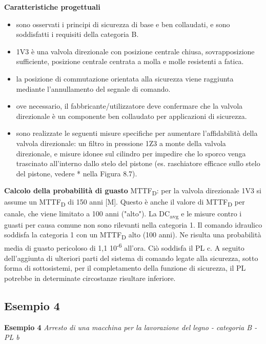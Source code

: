 \textbf{Caratteristiche progettuali}
\begin{itemize}
    \item sono osservati i principi di sicurezza di base e ben collaudati, e sono soddisfatti i requisiti della categoria B.
    \item 1V3 è una valvola direzionale con posizione centrale chiusa, sovrapposizione sufficiente, posizione centrale centrata a molla e molle resistenti a fatica.
    \item la posizione di commutazione orientata alla sicurezza viene raggiunta mediante l'annullamento del segnale di comando.
    \item ove necessario, il fabbricante/utilizzatore deve confermare che la valvola direzionale è un componente ben collaudato per applicazioni di sicurezza.
    \item sono realizzate le seguenti misure specifiche per aumentare l'affidabilità della valvola direzionale: un filtro in pressione 1Z3 a monte della valvola direzionale, e misure idonee sul cilindro per impedire che lo sporco venga trascinato all'interno dallo stelo del pistone (es. raschiatore efficace sullo stelo del pistone, vedere * nella Figura 8.7).
\end{itemize}

\textbf{Calcolo della probabilità di guasto}
MTTF\textsubscript{D}: per la valvola direzionale 1V3 si assume un MTTF\textsubscript{D} di 150 anni [M]. Questo è anche il valore di MTTF\textsubscript{D} per canale, che viene limitato a 100 anni ("alto").
La DC\textsubscript{avg} e le misure contro i guasti per causa comune non sono rilevanti nella categoria 1.
Il comando idraulico soddisfa la categoria 1 con un MTTF\textsubscript{D} alto (100 anni). Ne risulta una probabilità media di guasto pericoloso di 1,1 10\textsuperscript{-6} all'ora. Ciò soddisfa il PL c. A seguito dell'aggiunta di ulteriori parti del sistema di comando legate alla sicurezza, sotto forma di sottosistemi, per il completamento della funzione di sicurezza, il PL potrebbe in determinate circostanze risultare inferiore.
\clearpage

\subsection{Esempio 4}
\label{sec:08-2-4}
\textbf{Esempio 4}
\textit{Arresto di una macchina per la lavorazione del legno - categoria B - PL b}

\begin{center}
    \begin{minipage}{\textwidth}
        \centering
        \captionsetup{hypcap=false}
        \resizebox{0.85\textwidth}{!}{}
        \label{fig:08-09}
    \end{minipage}
\end{center}

